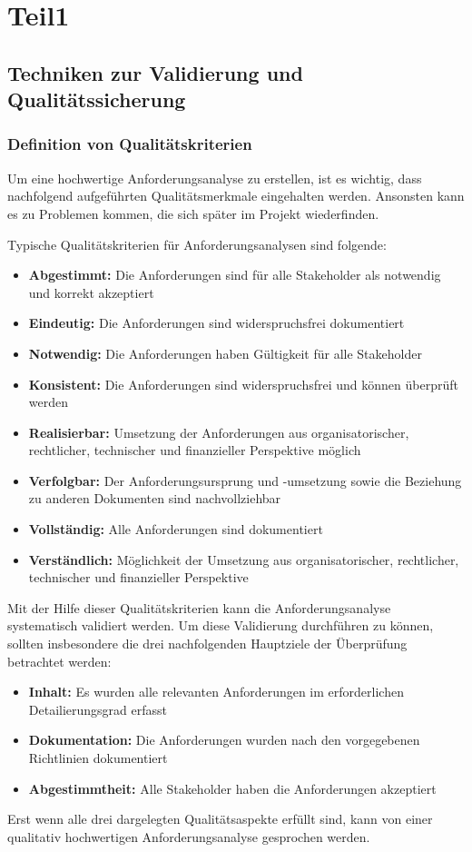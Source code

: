 
\section{Teil1}
\subsection{Techniken zur Validierung und Qualitätssicherung}
\subsubsection{Definition von Qualitätskriterien}
Um eine hochwertige Anforderungsanalyse zu erstellen, ist es wichtig, dass nachfolgend aufgeführten Qualitätsmerkmale eingehalten werden.
Ansonsten kann es zu Problemen kommen, die sich später im Projekt wiederfinden.

Typische Qualitätskriterien für Anforderungsanalysen sind folgende:
\begin{itemize}
    \item \textbf{Abgestimmt:} Die Anforderungen sind für alle Stakeholder als notwendig und korrekt akzeptiert
    \item \textbf{Eindeutig:} Die Anforderungen sind widerspruchsfrei dokumentiert
    \item \textbf{Notwendig:} Die Anforderungen haben Gültigkeit für alle Stakeholder
    \item \textbf{Konsistent:} Die Anforderungen sind widerspruchsfrei und können überprüft werden
    \item \textbf{Realisierbar:} Umsetzung der Anforderungen aus organisatorischer, rechtlicher, technischer und finanzieller Perspektive möglich
    \item \textbf{Verfolgbar:} Der Anforderungsursprung und -umsetzung sowie die Beziehung zu anderen Dokumenten sind nachvollziehbar
    \item \textbf{Vollständig:} Alle Anforderungen sind dokumentiert
    \item \textbf{Verständlich:} Möglichkeit der Umsetzung aus organisatorischer, rechtlicher, technischer und finanzieller Perspektive
\end{itemize}\autocite[vgl.][Seite 44]{Maulhardt.b}

Mit der Hilfe dieser Qualitätskriterien kann die Anforderungsanalyse systematisch validiert werden.
Um diese Validierung durchführen zu können, sollten insbesondere die drei nachfolgenden Hauptziele der Überprüfung betrachtet werden:
\begin{itemize}
    \item \textbf{Inhalt:} Es wurden alle relevanten Anforderungen im erforderlichen Detailierungsgrad erfasst
    \item \textbf{Dokumentation:} Die Anforderungen wurden nach den vorgegebenen Richtlinien dokumentiert
    \item \textbf{Abgestimmtheit:} Alle Stakeholder haben die Anforderungen akzeptiert
\end{itemize}
Erst wenn alle drei dargelegten Qualitätsaspekte erfüllt sind, kann von einer qualitativ hochwertigen Anforderungsanalyse gesprochen werden\autocite[vgl.][Seite 16ff]{Maulhardt.c}.

